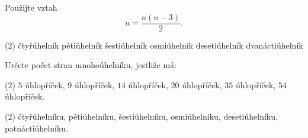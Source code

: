 \documentclass[12pt,a4paper]{article}
\begin{document}

\setcounter{section}{3}


\begin{exercise}

    Použijte vztah
    \[
        u=\frac{n(n-3)}{2}.
    \]

    \begin{tasks}(2)
        \task čtyřúhelník
        \task pětiúhelník
        \task šestiúhelník
        \task osmiúhelník
        \task desetiúhelník
        \task dvanáctiúhelník
    \end{tasks}

\end{exercise}



\begin{exercise}

    Určete počet stran mnohoúhelníku, jestliže má:

    \begin{tasks}(2)
        \task $5$ úhlopříček,
        \task $9$ úhlopříček,
        \task $14$ úhlopříček,
        \task $20$ úhlopříček,
        \task $35$ úhlopříček,
        \task $54$ úhlopříček.
    \end{tasks}

\end{exercise}



\begin{exercise}

    \begin{tasks}(2)
        \task čtyřúhelníku,
        \task pětiúhelníku,
        \task šestiúhelníku,
        \task osmiúhelníku,
        \task desetiúhelníku,
        \task patnáctiúhelníku.
    \end{tasks}

\end{exercise}


\end{document}
